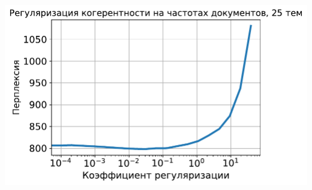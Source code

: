 \documentclass[unicode]{beamer}
\begin{document}
\begin{frame}
\begin{center}
    \includegraphics[scale=0.30]{perplexity_coherence_df_reg_25_topics.pdf}
\end{center}
\end{frame}
\end{document}
